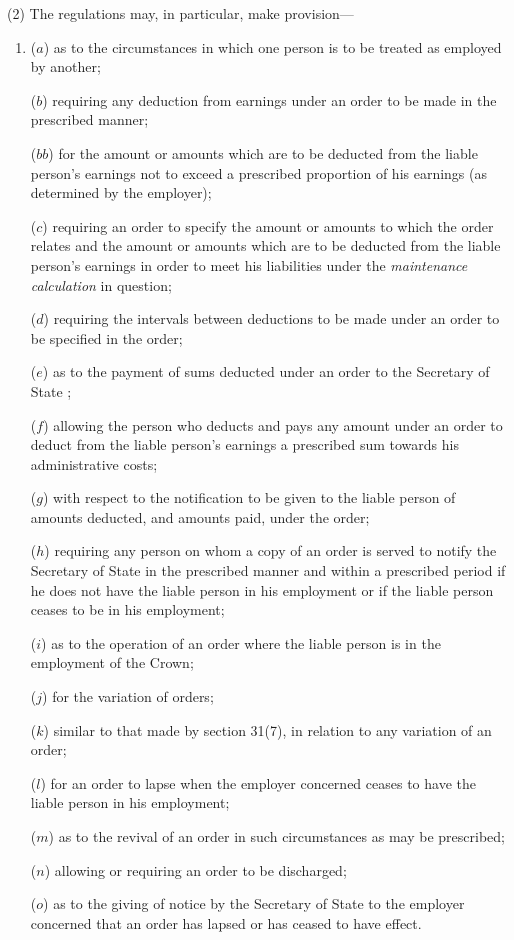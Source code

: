 \documentclass[12pt,a4paper]{article}
\begin{document}
(2) The regulations may, in particular, make provision—
\begin{enumerate}\item[]
($a$) as to the circumstances in which one person is to be treated as employed by another;

($b$) requiring any deduction from earnings under an order to be made in the prescribed manner;

($bb$) for the amount or amounts which are to be deducted from the liable person’s earnings not to exceed a prescribed proportion of his earnings (as determined by the employer);

($c$) requiring an order to specify the amount or amounts to which the order relates and the amount or amounts which are to be deducted from the liable person’s earnings in order to meet his liabilities under the 
\emph{maintenance calculation}  %
in question;

($d$) requiring the intervals between deductions to be made under an order to be specified in the order;

($e$) as to the payment of sums deducted under an order to the 
Secretary of State%
;

($f$) allowing the person who deducts and pays any amount under an order to deduct from the liable person’s earnings a prescribed sum towards his administrative costs;

($g$) with respect to the notification to be given to the liable person of amounts deducted, and amounts paid, under the order;

($h$) requiring any person on whom a copy of an order is served to notify the 
Secretary of State  %
in the prescribed manner and within a prescribed period if he does not have the liable person in his employment or if the liable person ceases to be in his employment;

($i$) as to the operation of an order where the liable person is in the employment of the Crown;

($j$) for the variation of orders;

($k$) similar to that made by section 31(7), in relation to any variation of an order;

($l$) for an order to lapse when the employer concerned ceases to have the liable person in his employment;

($m$) as to the revival of an order in such circumstances as may be prescribed;

($n$) allowing or requiring an order to be discharged;

($o$) as to the giving of notice by the 
Secretary of State  %
to the employer concerned that an order has lapsed or has ceased to have effect.
\end{enumerate}
\end{document}
